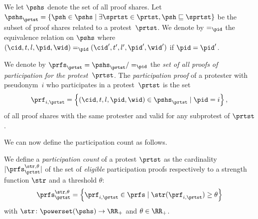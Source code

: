 We let \(\pshs\) denote the set of all proof shares.
Let \(
  \pshs_\prtst = \{ \psh \in \pshs \mid
    \exists \sprtst \in \prtst, \psh \sqsubseteq \sprtst \}
\) be the subset of proof shares related to a protest~\(\prtst\).
We denote by \(=_\pid\) the equivalence relation on \(\pshs\) where \((\cid, t, 
l, \pid, \wid) =_\pid (\cid', t', l', \pid', \wid')\) if \(\pid = \pid'\).

\begin{definition}%
  \label{DefParticipationProof}\label{DefParticipationProofs}
  We denote by \(\prfs_\prtst = \pshs_\prtst/=_\pid\) the \emph{set of all 
  proofs of participation for the protest~\(\prtst\)}.
  The \emph{participation proof} of a protester with pseudonym~\(i\) who 
  participates in a protest~\(\prtst\) is the set
  \begin{equation}
    \nonumber
    \prf_{i, \prtst} =
    \left\{ (\cid, t, l, \pid, \wid) \in \pshs_\prtst \mid
      \pid = i\right\},
  \end{equation}
  of all proof shares with the same protester and valid for any subprotest of 
  \(\prtst\).
\end{definition}


We can now define the participation count as follows.
\begin{definition}%
  \label{DefParticipationCount}
  We define a \emph{participation count} of a protest \(\prtst\) as the cardinality 
  \(|\prfs_{\prtst}^{\str,\theta}|\) of the set of \emph{eligible} participation proofs respectively to a strength function $\str$ and a threshold $\theta$: \[
    \prfs_{\prtst}^{\str,\theta} = \left\{ \prf_{i,\prtst} \in \prfs \mid
      \str(\prf_{i,\prtst})\geq \theta \right\}
  \] with \(\str\colon \powerset(\pshs)\to \RR_+\) and  \(\theta \in \RR_+\).
\end{definition}

